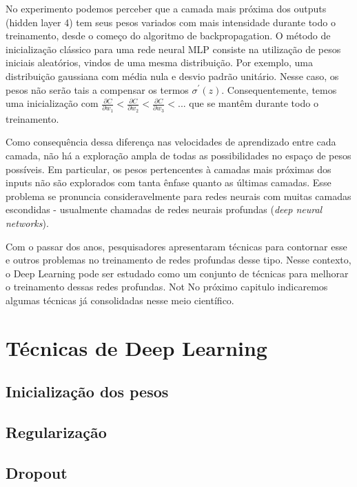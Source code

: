 \documentclass[
	12pt,				%
	oneside,			%
	a4paper,			%
	english,			%
	french,				%
	spanish,			%
	brazil,				%
	]{abntex2}
\begin{document}
No experimento podemos perceber que a camada mais próxima dos outputs (hidden layer 4) tem seus pesos variados com mais intensidade durante todo o treinamento, desde o começo do algoritmo de backpropagation. O método de inicialização clássico para uma rede neural MLP consiste na utilização de pesos iniciais aleatórios, vindos de uma mesma distribuição. Por exemplo, uma distribuição gaussiana com média nula e desvio padrão unitário. Nesse caso, os pesos não serão tais a compensar os termos $\sigma^{'}(z)$. Consequentemente, temos uma inicialização com $\frac{\partial C}{\partial w_1} < \frac{\partial C}{\partial w_2} < \frac{\partial C}{\partial w_3} < ... $ que se mantêm durante todo o treinamento.

Como consequência dessa diferença nas velocidades de aprendizado entre cada camada, não há a exploração ampla de todas as possibilidades no espaço de pesos possíveis. Em particular, os pesos pertencentes à camadas mais próximas dos inputs não são explorados com tanta ênfase quanto as últimas camadas. Esse problema se pronuncia consideravelmente para redes neurais com muitas camadas escondidas - usualmente chamadas de redes neurais profundas (\textit{deep neural networks}).

Com o passar dos anos, pesquisadores apresentaram técnicas para contornar esse e outros problemas no treinamento de redes profundas desse tipo. Nesse contexto, o Deep Learning pode ser estudado como um conjunto de técnicas para melhorar o treinamento dessas redes profundas. Not No próximo capitulo indicaremos algumas técnicas já consolidadas nesse meio científico.

\chapter{Técnicas de Deep Learning}

\section{Inicialização dos pesos}

\section{Regularização}

\section{Dropout}
\end{document}
